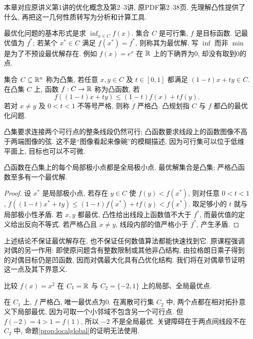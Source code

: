 \label{chap:1}
本章对应原讲义第1讲的优化概念及第2--3讲, 原PDF第2--38页. 先理解凸性提供了什么, 再把这一几何性质转写为分析和计算工具.

最优化问题的基本形式是求 $\inf_{x\in C}f(x)$. 集合 $C$ 是可行集, $f$ 是目标函数. 记最优值为 $f^*$; 若某个 $x^*\in C$ 满足 $f(x^*)=f^*$, 则称其为最优解. 写 $\inf$ 而非 $\min$ 是为了不预设最优解存在. 例如 $f(x)=e^x$ 在 $\mathbb R$ 上的下确界为0, 却没有取到0的点.

\begin{definition}
集合 $C\subseteq\mathbb R^n$ 称为凸集, 若任意 $x,y\in C$ 及 $t\in[0,1]$ 都满足 $(1-t)x+ty\in C$. 在凸集 $C$ 上, 函数 $f:C\to\mathbb R$ 称为凸函数, 若
\[
f((1-t)x+ty)\le(1-t)f(x)+tf(y).
\]
若对 $x\ne y$ 及 $0<t<1$ 不等号严格, 则称 $f$ 严格凸. 凸规划指 $C$ 与 $f$ 都凸的最优化问题.
\end{definition}
凸集要求连接两个可行点的整条线段仍然可行; 凸函数要求线段上的函数图像不高于两端图像的弦. 这不是“图像看起来像碗”的模糊描述, 因为可行集可以位于低维平面上, 目标也可以不可微.

\begin{proposition}\label{prop:localglobal}
凸函数在凸集上的每个局部极小点都是全局极小点. 最优解集合是凸集; 严格凸函数至多有一个最优解.
\end{proposition}
\begin{proof}
设 $x^*$ 是局部极小点, 若存在 $y\in C$ 使 $f(y)<f(x^*)$, 则对任意 $0<t<1$,
$f((1-t)x^*+ty)\le(1-t)f(x^*)+tf(y)<f(x^*)$. 取足够小的 $t$ 就与局部极小性矛盾. 若 $x,y$ 都最优, 凸性给出线段上函数值不大于 $f^*$, 而最优值的定义给出反向不等式. 若严格凸且 $x\ne y$, 线段内部的值严格小于 $f^*$, 产生矛盾.
\end{proof}
上述结论不保证最优解存在, 也不保证任何数值算法都能快速找到它. 原课程强调对偶的另一作用: 即使原问题含有整数限制或其他非凸结构, 由拉格朗日乘子得到的对偶目标仍是凹函数, 因而对偶最大化具有凸优化结构. 我们将在对偶章节证明这一点及其下界意义.

\begin{example}
比较 $f(x)=x^2$ 在 $C_1=\mathbb R$ 与 $C_2=\{-2,1\}$ 上的局部、全局最优点.
\end{example}
\begin{solution}
在 $C_1$ 上, $f$ 严格凸, 唯一最优点为0. 在离散可行集 $C_2$ 中, 两个点都在相对拓扑意义下局部最优, 因为可取一个小邻域不包含另一个可行点. 但 $f(-2)=4>1=f(1)$, 所以 $-2$ 不是全局最优. 关键障碍在于两点间线段不在 $C_2$ 中, 命题\ref{prop:localglobal}的证明无法使用.
\end{solution}

